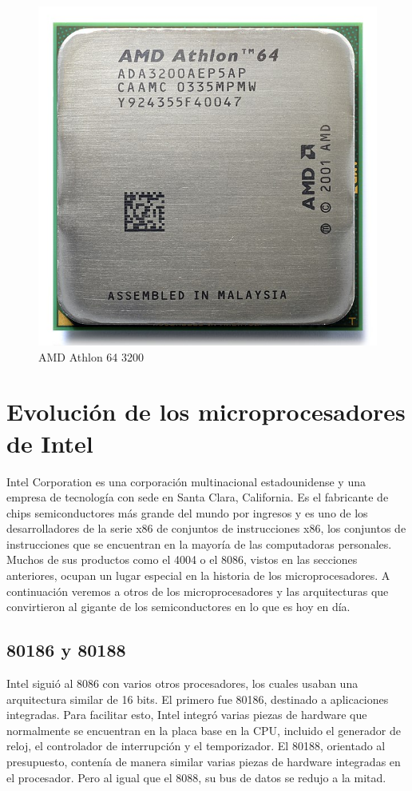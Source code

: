 \begin{figure}[htb]
	\centering
	\includegraphics[scale = 0.15]{Graphics/AMD_Athlon_64_3200+_ADA3200AEP5AP.jpg}
	\caption{AMD Athlon 64 3200}
	\label{fig:19}
\end{figure}

\section{Evolución de los microprocesadores de Intel}
Intel Corporation es una corporación multinacional estadounidense y una empresa de tecnología con sede en Santa Clara, California. 
Es el fabricante de chips semiconductores más grande del mundo por ingresos y es uno de los desarrolladores de la serie x86 
de conjuntos de instrucciones x86, los conjuntos de instrucciones que se encuentran en la mayoría de las 
computadoras personales. Muchos de sus productos como el 4004 o el 8086, vistos en las secciones anteriores, ocupan un lugar especial 
en la historia de los microprocesadores. A continuación veremos a otros  de los microprocesadores y las arquitecturas que convirtieron 
al gigante de los semiconductores en lo que es hoy en día.\

\subsection{80186 y 80188}
Intel siguió al 8086 con varios otros procesadores, los cuales usaban una arquitectura similar de 16 bits. El primero fue 80186, 
destinado a aplicaciones integradas. Para facilitar esto, Intel integró varias piezas de hardware que normalmente se encuentran en la 
placa base en la CPU, incluido el generador de reloj, el controlador de interrupción y el temporizador. El 80188, orientado al presupuesto, 
contenía de manera similar varias piezas de hardware integradas en el procesador. Pero al igual que el 8088, su bus de datos se redujo a la 
mitad.
